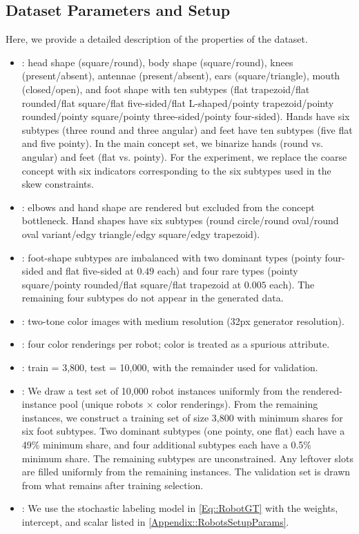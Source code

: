 \subsection{Dataset Parameters and Setup}
\label{Appendix::RobotsImageParams}
Here, we provide a detailed description of the properties of the  dataset.
\begin{itemize}
    \item {}: head shape (square/round), body shape (square/round), knees (present/absent), antennae (present/absent), ears (square/triangle), mouth (closed/open), and foot shape with ten subtypes (flat trapezoid/flat rounded/flat square/flat five-sided/flat L-shaped/pointy trapezoid/pointy rounded/pointy square/pointy three-sided/pointy four-sided). Hands have six subtypes (three round and three angular) and feet have ten subtypes (five flat and five pointy). In the main concept set, we binarize hands (round vs. angular) and feet (flat vs. pointy). For the  experiment, we replace the coarse  concept with six  indicators corresponding to the six subtypes used in the skew constraints.
    \item {}: elbows and hand shape are rendered but excluded from the concept bottleneck. Hand shapes have six subtypes (round circle/round oval/round oval variant/edgy triangle/edgy square/edgy trapezoid).
    \item {}: foot-shape subtypes are imbalanced with two dominant types (pointy four-sided and flat five-sided at $0.49$ each) and four rare types (pointy square/pointy rounded/flat square/flat trapezoid at $0.005$ each). The remaining four subtypes do not appear in the generated data.
    \item {}: two-tone color images with medium resolution (32px generator resolution).
    \item {}: four color renderings per robot; color is treated as a spurious attribute.
    \item {}: train = 3{,}800, test = 10{,}000, with the remainder used for validation.
    \item {}: We draw a test set of 10{,}000 robot instances uniformly from the rendered-instance pool (unique robots $\times$ color renderings). From the remaining instances, we construct a training set of size 3{,}800 with minimum shares for six foot subtypes. Two dominant subtypes (one pointy, one flat) each have a 49\% minimum share, and four additional subtypes each have a 0.5\% minimum share. The remaining subtypes are unconstrained. Any leftover slots are filled uniformly from the remaining instances. The validation set is drawn from what remains after training selection.
    \item {}: We use the stochastic labeling model in \cref{Eq::RobotGT} with the weights, intercept, and scalar listed in \cref{Appendix::RobotsSetupParams}.
\end{itemize}


